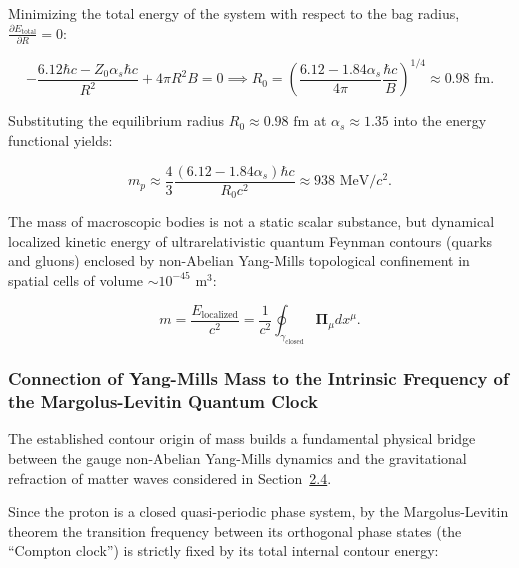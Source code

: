 Minimizing the total energy of the system with respect to the bag radius, $\frac{\partial E_{\text{total}}}{\partial R} = 0$:

\begin{equation}\label{eq:2.3.47}\tag{2.3.47}
- \frac{6.12 \hbar c - Z_0 \alpha_s \hbar c}{R^2} + 4\pi R^2 B = 0 \implies R_0 = \left( \frac{6.12 - 1.84 \alpha_s}{4\pi} \frac{\hbar c}{B} \right)^{1/4} \approx 0.98\text{ fm}.
\end{equation}

Substituting the equilibrium radius $R_0 \approx 0.98\text{ fm}$ at $\alpha_s \approx 1.35$ into the energy functional yields:

\begin{equation}\label{eq:2.3.48}\tag{2.3.48}
m_p \approx \frac{4}{3} \frac{(6.12 - 1.84\alpha_s)\hbar c}{R_0 c^2} \approx 938\text{ MeV}/c^2.
\end{equation}

\begin{theorem}\label{thm:2.3.5}
The mass of macroscopic bodies is not a static scalar substance, but dynamical localized kinetic energy of ultrarelativistic quantum Feynman contours (quarks and gluons) enclosed by non-Abelian Yang-Mills topological confinement in spatial cells of volume $\sim 10^{-45}\text{ m}^3$:

\begin{equation}\label{eq:2.3.49}\tag{2.3.49}
m = \frac{E_{\text{localized}}}{c^2} = \frac{1}{c^2} \oint_{\gamma_{\text{closed}}} \mathbf{\Pi}_\mu dx^\mu.
\end{equation}
\end{theorem}

\subsubsection{Connection of Yang-Mills Mass to the Intrinsic Frequency of the Margolus-Levitin Quantum Clock}\label{sec:2.3.8}

The established contour origin of mass builds a fundamental physical bridge between the gauge non-Abelian Yang-Mills dynamics and the gravitational refraction of matter waves considered in Section~\hyperref[sec:2.4]{2.4}.

Since the proton is a closed quasi-periodic phase system, by the Margolus-Levitin theorem the transition frequency between its orthogonal phase states (the ``Compton clock'') is strictly fixed by its total internal contour energy:

